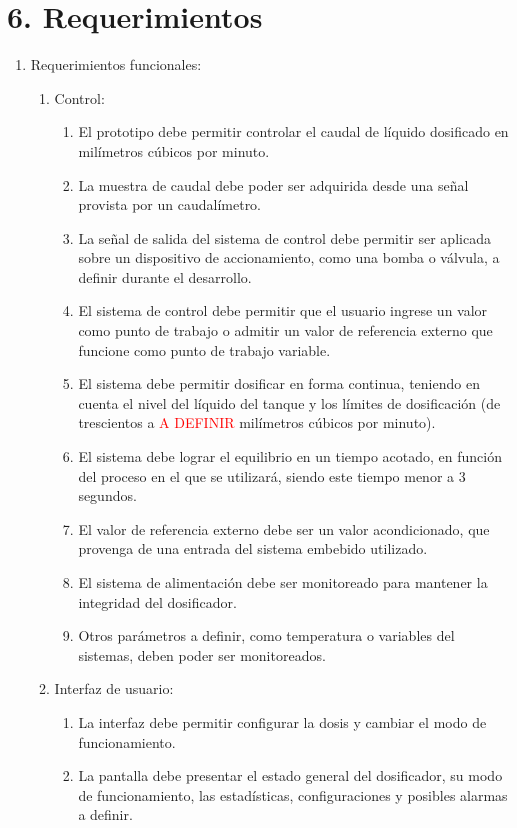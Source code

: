 \documentclass[
11pt, %
]{charter}
\begin{document}
\section{6. Requerimientos}
\label{sec:requerimientos}

\begin{enumerate}
	\item Requerimientos funcionales:
		\begin{enumerate}
			\item Control:
			\begin{enumerate}
			\item El prototipo debe permitir controlar el caudal de líquido dosificado en milímetros cúbicos por minuto.
			\item La muestra de caudal debe poder ser adquirida desde una señal provista por un caudalímetro.
			\item La señal de salida del sistema de control debe permitir ser aplicada sobre un dispositivo de accionamiento, como una bomba o válvula, a definir durante el desarrollo.
			\item El sistema de control debe permitir que el usuario ingrese un valor como punto de trabajo o admitir un valor de referencia externo que funcione como punto de trabajo variable.
			\item El sistema debe permitir dosificar en forma continua, teniendo en cuenta el nivel del líquido del tanque y los límites de dosificación (de trescientos a \textcolor{red}{A DEFINIR} milímetros cúbicos por minuto).
			\item El sistema debe lograr el equilibrio en un tiempo acotado, en función del proceso en el que se utilizará, siendo este tiempo menor a 3 segundos.			
			\item El valor de referencia externo debe ser un valor acondicionado, que provenga de una entrada del sistema embebido utilizado.
			\item El sistema de alimentación debe ser monitoreado para mantener la integridad del dosificador.
			\item Otros parámetros a definir, como temperatura o variables del sistemas, deben poder ser monitoreados.
			\end{enumerate}
			\item Interfaz de usuario:
			\begin{enumerate}
			\item La interfaz debe permitir configurar la dosis y cambiar el modo de funcionamiento.
			\item La pantalla debe presentar el estado general del dosificador, su modo de funcionamiento, las estadísticas, configuraciones y posibles alarmas a definir.

\end{enumerate}
\end{enumerate}
\end{enumerate}
\end{document}
